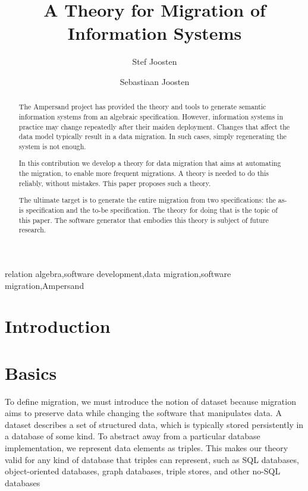 \documentclass{elsarticle}
\begin{document}


\title{A Theory for Migration of Information Systems}
\author[ou,ordina]{Stef Joosten}
\author[umn]{Sebastiaan Joosten}
\address[ou]{Open Universiteit Nederland, Heerlen, the Netherlands}
\address[ordina]{Ordina NV, Nieuwegein, the Netherlands}
\address[umn]{University of Minnesota, Minneapolis, USA}

\begin{abstract}
	The Ampersand project has provided the theory and tools to generate semantic information systems from an algebraic specification.
	However, information systems in practice may change repeatedly after their maiden deployment.
	Changes that affect the data model typically result in a data migration.
	In such cases, simply regenerating the system is not enough.

	In this contribution we develop a theory for data migration that aims at automating the migration,
	to enable more frequent migrations.
	A theory is needed to do this reliably, without mistakes.
	This paper proposes such a theory.

	The ultimate target is to generate the entire migration from two specifications: the as-is specification and the to-be specification.
	The theory for doing that is the topic of this paper.
	The software generator that embodies this theory is subject of future research.
\end{abstract}

\begin{keyword}
relation algebra\sep software development\sep data migration\sep software migration\sep Ampersand
\end{keyword}
\maketitle

\section{Introduction}
\label{sct:Introduction}

\section{Basics}
\label{sct:Basics}
	To define migration, we must introduce the notion of dataset
	because migration aims to preserve data while changing the software that manipulates data.
	A dataset describes a set of structured data, which is typically stored persistently in a database of some kind.
	To abstract away from a particular database implementation,
	we represent data elements as triples.
	This makes our theory valid for any kind of database that triples can represent,
	such as SQL databases, object-oriented databases, graph databases, triple stores, and other no-SQL databases
\end{document}

